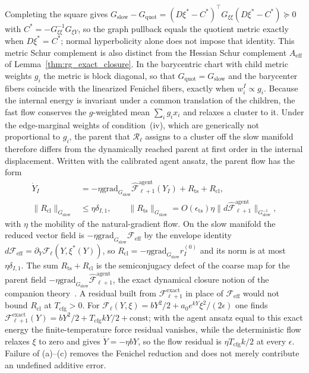 \documentclass[11pt]{article}
\begin{document}
Completing the square gives $G_{\mathrm{slow}}-G_{\mathrm{quot}}=(D\xi^*-C^*)^\top G_{\xi\xi}(D\xi^*-C^*)\succeq0$ with $C^*=-G_{\xi\xi}^{-1}G_{\xi Y}$, so the graph pullback equals the quotient metric exactly when $D\xi^*=C^*$; normal hyperbolicity alone does not impose that identity. This metric Schur complement is also distinct from the Hessian Schur complement $A_{\mathrm{eff}}$ of Lemma~\ref{thm:rg_exact_closure}. In the barycentric chart with child metric weights $g_i$ the metric is block diagonal, so that $G_{\mathrm{quot}}=G_{\mathrm{slow}}$ and the barycenter fibers coincide with the linearized Fenichel fibers, exactly when $w_i^I\propto g_i$. Because the internal energy is invariant under a common translation of the children, the fast flow conserves the $g$-weighted mean $\sum_ig_ix_i$ and relaxes a cluster to it. Under the edge-marginal weights of condition~(iv), which are generically not proportional to $g_i$, the parent that $\mathcal{R}_\ell$ assigns to a cluster off the slow manifold therefore differs from the dynamically reached parent at first order in the internal displacement. Written with the calibrated agent ansatz, the parent flow has the form
\begin{align}
\dot{Y}_I
 &= -\eta\mathrm{grad}_{G_{\mathrm{slow}}}\widehat{\mathcal{F}}^{\mathrm{agent}}_{\ell+1}(Y_I)+R_{\mathrm{ts}}+R_{\mathrm{cl}}, \nonumber\\
\|R_{\mathrm{cl}}\|_{G_{\mathrm{slow}}}
 &\leq \eta\delta_{I,1}, \qquad
\|R_{\mathrm{ts}}\|_{G_{\mathrm{slow}}}=O(\epsilon_{\mathrm{ts}})\eta\|d\widehat{\mathcal{F}}^{\mathrm{agent}}_{\ell+1}\|_{G_{\mathrm{slow}}^{-1}},
\label{eq:rg_schur_flow}
\end{align}
with $\eta$ the mobility of the natural-gradient flow. On the slow manifold the reduced vector field is $-\eta\mathrm{grad}_{G_{\mathrm{slow}}}\mathcal{F}_{\mathrm{eff}}$ by the envelope identity $d\mathcal{F}_{\mathrm{eff}}=\partial_Y\mathcal{F}_\ell(Y,\xi^*(Y))$, so $R_{\mathrm{cl}}=-\eta\mathrm{grad}_{G_{\mathrm{slow}}}r_I^{(0)}$ and its norm is at most $\eta\delta_{I,1}$. The sum $R_{\mathrm{ts}}+R_{\mathrm{cl}}$ is the semiconjugacy defect of the coarse map for the parent field $-\eta\mathrm{grad}_{G_{\mathrm{slow}}}\widehat{\mathcal{F}}^{\mathrm{agent}}_{\ell+1}$, the exact dynamical closure notion of the companion theory~\cite[Ch.~11]{DennisGaugeVFE2026}. A residual built from $\mathcal{F}^{\mathrm{exact}}_{\ell+1}$ in place of $\mathcal{F}_{\mathrm{eff}}$ would not bound $R_{\mathrm{cl}}$ at $T_{\mathrm{cfg}}>0$. For $\mathcal{F}_\ell(Y,\xi)=bY^2/2+a_0e^{kY}\xi^2/(2\epsilon)$ one finds $\mathcal{F}^{\mathrm{exact}}_{\ell+1}(Y)=bY^2/2+T_{\mathrm{cfg}}kY/2+\mathrm{const}$; with the agent ansatz equal to this exact energy the finite-temperature force residual vanishes, while the deterministic flow relaxes $\xi$ to zero and gives $\dot Y=-\eta bY$, so the flow residual is $\eta T_{\mathrm{cfg}}k/2$ at every $\epsilon$. Failure of (a)--(c) removes the Fenichel reduction and does not merely contribute an undefined additive error.
\end{document}
